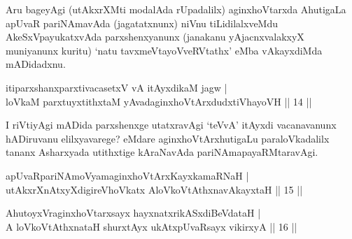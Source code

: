 \begin{artha}
Aru bageyAgi (utAkxrXMti modalAda rUpadalilx) aginxhoVtarxda AhutigaLa 
apUvaR pariNAmavAda (jagatatxnunx) niVnu tiLidilalxveMdu 
AkeSxVpayukatxvAda parxshenxyanunx (janakanu yAjacnxvalakxyX 
muniyanunx kuritu) `natu tavxmeVtayoVveRVtathx' eMba vAkayxdiMda 
mADidadxnu.
\end{artha}

\begin{shl}
\footnotemark[2]itiparxshanxparxtivacasetxV vA itAyxdikaM jagw | \\
loVkaM parxtuyxtithxtaM yAvadaginxhoVtArxdudxtiVhayoVH \hfill|| 14 || 
\end{shl}

\begin{artha}
I riVtiyAgi mADida parxshenxge utatxravAgi `teVvA' itAyxdi 
vacanavanunx hADiruvanu elilxyavarege? eMdare aginxhoVtArxhutigaLu 
paraloVkadalilx tananx Asharxyada utithxtige kAraNavAda 
pariNAmapayaRMtaravAgi.
\end{artha}

\begin{shl}
apUvaRpariNAmoV\s yamaginxhoVtArxKayxkamaRNaH | \\
utAkxrXnAtxyXdigireVhoVkatx AloVkoVtAthxnavAkayxtaH ||  15 ||  
\end{shl}


\begin{shl}
AhutoyxVraginxhoVtarxsayx hayxnatxrikASxdiBeVdataH | \\
A loVkoVtAthxnataH shurxtAyx ukAtx\s pUvaRsayx vikirxyA ||  16 ||  
\end{shl}

